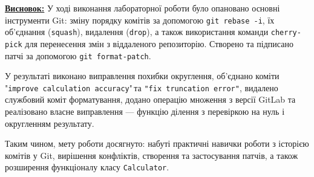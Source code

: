 \documentclass[12pt,a4paper]{article}
\begin{document}
    \textbf{\underline{Висновок:}} У ході виконання лабораторної роботи було опановано основні інструменти Git: 
зміну порядку комітів за допомогою \texttt{git rebase -i}, їх об’єднання (\texttt{squash}), 
видалення (\texttt{drop}), а також використання команди \texttt{cherry-pick} для 
перенесення змін з віддаленого репозиторію. Створено та підписано патчі за допомогою 
\texttt{git format-patch}.

\setlength{\parindent}{1.5em}

У результаті виконано виправлення похибки округлення, об’єднано коміти 
"\texttt{improve calculation accuracy}"\,та \texttt{"fix truncation error"}, видалено службовий 
коміт форматування, додано операцію множення з версії GitLab та реалізовано власне 
виправлення --- функцію ділення з перевіркою на нуль і округленням результату.  

Таким чином, мету роботи досягнуто: набуті практичні навички роботи з історією 
комітів у Git, вирішення конфліктів, створення та застосування патчів, а також 
розширення функціоналу класу \texttt{Calculator}.
\end{document}
